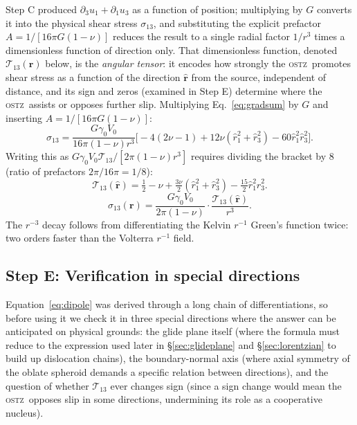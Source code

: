 \documentclass[3p]{elsarticle}
\newcommand{\OSTZ}{\textsc{ostz}}
\newcommand{\gz}{\gamma_0}
\begin{document}
Step C produced $\partial_3u_1+\partial_1u_3$ as a function of
position; multiplying by $G$ converts it into the physical shear
stress $\sigma_{13}$, and substituting the explicit prefactor
$A=1/[16\pi G(1-\nu)]$ reduces the result to a single radial factor
$1/r^3$ times a dimensionless function of direction only. That
dimensionless function, denoted $\mathcal T_{13}(\hat{\mathbf r})$
below, is the \emph{angular tensor}: it encodes how strongly the
\OSTZ\ promotes shear stress as a function of the direction
$\hat{\mathbf r}$ from the source, independent of distance, and its
sign and zeros (examined in Step E) determine where the \OSTZ\
assists or opposes further slip. Multiplying Eq.~\eqref{eq:gradsum}
by $G$ and inserting $A=1/[16\pi G(1-\nu)]$:
\[
  \sigma_{13}=\frac{G\gz V_0}{16\pi(1-\nu)r^3}
  \bigl[-4(2\nu-1)+12\nu(\hat r_1^2+\hat r_3^2)-60\hat r_1^2\hat r_3^2
  \bigr].
\]
Writing this as $G\gz V_0\mathcal T_{13}/[2\pi(1-\nu)r^3]$ requires
dividing the bracket by 8 (ratio of prefactors $2\pi/16\pi=1/8$):
\begin{equation}
  \boxed{\mathcal T_{13}(\hat{\mathbf r})
  =\tfrac{1}{2}-\nu+\tfrac{3\nu}{2}(\hat r_1^2+\hat r_3^2)
  -\tfrac{15}{2}\hat r_1^2\hat r_3^2.}
  \label{eq:Tij}
\end{equation}
\begin{equation}
  \boxed{\sigma_{13}(\mathbf r)=\frac{G\gz V_0}{2\pi(1-\nu)}
  \cdot\frac{\mathcal T_{13}(\hat{\mathbf r})}{r^3}.}
  \label{eq:dipole}
\end{equation}
The $r^{-3}$ decay follows from differentiating the Kelvin $r^{-1}$
Green's function twice: two orders faster than the Volterra $r^{-1}$
field.

\subsection{Step E: Verification in special directions}
\label{sec:stepE}

Equation~\eqref{eq:dipole} was derived through a long chain of
differentiations, so before using it we check it in three special
directions where the answer can be anticipated on physical grounds:
the glide plane itself (where the formula must reduce to the
expression used later in \S\ref{sec:glideplane} and
\S\ref{sec:lorentzian} to build up dislocation chains), the
boundary-normal axis (where axial symmetry of the oblate spheroid
demands a specific relation between directions), and the question of
whether $\mathcal T_{13}$ ever changes sign (since a sign change
would mean the \OSTZ\ opposes slip in some directions, undermining
its role as a cooperative nucleus).
\end{document}
